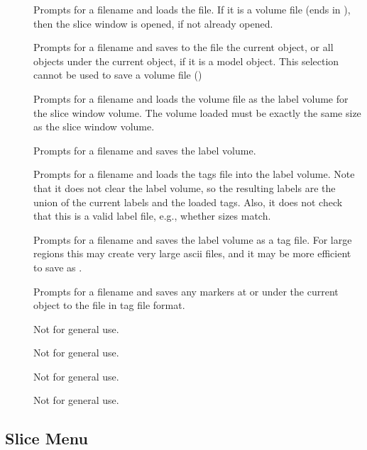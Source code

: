 \begin{description}
\item[]  Prompts for a filename and loads the file.
        If it is a volume file (ends in ), then the
        slice window is opened, if not already opened.
\item[]  Prompts for a filename and saves to the file
        the current object, or all objects under the current object, if it is
        a model object.  This selection cannot be used to save a volume
        file ()
\item[]  Prompts for a filename and
        loads the volume file as the label volume for the slice window
        volume.
        The volume loaded must be exactly the same size as the slice
        window volume.
\item[]  Prompts for a filename and
        saves the label volume.
\item[]  Prompts for a filename and
        loads the tags file into the label volume.  Note that it does not
        clear the label volume, so the resulting labels are the union
        of the current labels and the loaded tags.  Also, it does not check
        that this is a valid label file, e.g., whether sizes match.
\item[]  Prompts for a filename and
        saves the label volume as a tag file.  For large regions
        this may create very large ascii files, and it may be more
        efficient to save as .
\item[]  Prompts for a filename and
        saves any markers at or under the current object to the file
        in tag file format.

\item[]  Not for general use.
\item[]  Not for general use.
\item[]  Not for general use.
\item[]  Not for general use.
\end{description}

\subsection{Slice Menu}

